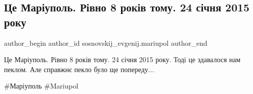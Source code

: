  
 
 
 
 

\subsection{Це Маріуполь. Рівно 8 років тому. 24 січня 2015 року}
\label{sec:24_01_2023.fb.sosnovskij_evgenij.mariupol.1.tse_mar_upol__r_vno_}

\ifcmt
 author_begin
   author_id sosnovskij_evgenij.mariupol
 author_end
\fi

Це Маріуполь. Рівно 8 років тому. 24 січня 2015 року. Тоді це здавалося нам
пеклом. Але справжнє пекло було ще попереду... 

\#Маріуполь \#Mariupol
